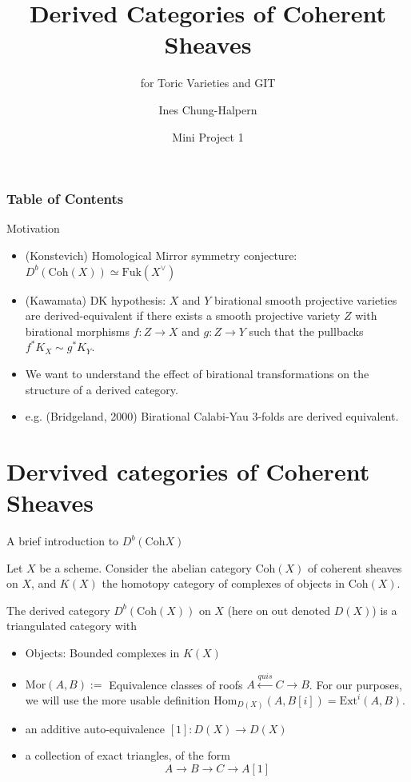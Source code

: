 \documentclass{beamer}
\title[Derived Categories of Coherent Sheaves] %
{Derived Categories of Coherent Sheaves}
\subtitle{for Toric Varieties and GIT}
\author[Chung-Halpern] %
{Ines Chung-Halpern}
\institute[] %
{  
  LSGNT
}
\date[May 2024] %
{Mini Project 1}
\begin{document}
\frame{\titlepage}


\begin{frame}
\frametitle{Table of Contents}
\tableofcontents
\end{frame}

\begin{frame}{Motivation}
    \begin{itemize}
        \item (Konstevich) Homological Mirror symmetry conjecture: $D^{b}(\mathrm{Coh} (X)) \simeq \mathrm{Fuk}(X^{\vee})$ 
        \item (Kawamata)  DK hypothesis:  $X$ and $Y$ birational smooth projective varieties are derived-equivalent if there exists a smooth projective variety $Z$ with birational morphisms $f: Z \to X$ and $g: Z\to Y$ such that the pullbacks $f^{*}K_{X}\sim g^{*}K_{Y}$.
        \item We want to understand the effect of birational transformations on the structure of a derived category. 
        \item e.g. (Bridgeland, 2000) Birational Calabi-Yau 3-folds are derived equivalent.
    \end{itemize}
\end{frame}

\section{Dervived categories of Coherent Sheaves}

\begin{frame}{A brief introduction to $D^b (\mathrm{Coh} X)$}

Let $X$ be a scheme. Consider the abelian category $\mathrm{Coh}(X)$ of coherent sheaves on $X$, and $K(X)$ the homotopy category of complexes of objects in $\mathrm{Coh}(X)$. 

\begin{definition}
    The derived category $D^{b}(\mathrm{Coh}(X))$ on $X$ (here on out denoted $D(X)$) is a triangulated category with 
    \begin{itemize}
        \item Objects: Bounded complexes in $K(X)$
        \item $\mathrm{Mor}(A,B):=$ Equivalence classes of roofs $A \xleftarrow{quis} C \to B$. 
        For our purposes, we will use the more usable definition $\mathrm{Hom}_{D(X)}(A,B[i]) = \mathrm{Ext}^{i}(A,B)$.
        \item an additive auto-equivalence $[1]: D(X)\to D(X)$
        \item a collection of exact triangles, of the form $$A \to B \to C \to A[1]$$
    \end{itemize}

\end{definition}    
\end{frame}
\end{document}
